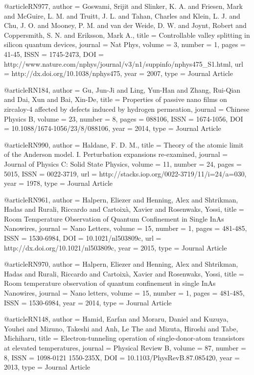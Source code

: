 @article{RN977,
   author = {Goswami, Srijit and Slinker, K. A. and Friesen, Mark and McGuire, L. M. and Truitt, J. L. and Tahan, Charles and Klein, L. J. and Chu, J. O. and Mooney, P. M. and van der Weide, D. W. and Joynt, Robert and Coppersmith, S. N. and Eriksson, Mark A.},
   title = {Controllable valley splitting in silicon quantum devices},
   journal = {Nat Phys},
   volume = {3},
   number = {1},
   pages = {41-45},
   ISSN = {1745-2473},
   DOI = {http://www.nature.com/nphys/journal/v3/n1/suppinfo/nphys475_S1.html},
   url = {http://dx.doi.org/10.1038/nphys475},
   year = {2007},
   type = {Journal Article}
}

@article{RN184,
   author = {Gu, Jun-Ji and Ling, Yun-Han and Zhang, Rui-Qian and Dai, Xun and Bai, Xin-De},
   title = {Properties of passive nano films on zircaloy-4 affected by defects induced by hydrogen permeation},
   journal = {Chinese Physics B},
   volume = {23},
   number = {8},
   pages = {088106},
   ISSN = {1674-1056},
   DOI = {10.1088/1674-1056/23/8/088106},
   year = {2014},
   type = {Journal Article}
}

@article{RN990,
   author = {Haldane, F. D. M.},
   title = {Theory of the atomic limit of the Anderson model. I. Perturbation expansions re-examined},
   journal = {Journal of Physics C: Solid State Physics},
   volume = {11},
   number = {24},
   pages = {5015},
   ISSN = {0022-3719},
   url = {http://stacks.iop.org/0022-3719/11/i=24/a=030},
   year = {1978},
   type = {Journal Article}
}

@article{RN961,
   author = {Halpern, Eliezer and Henning, Alex and Shtrikman, Hadas and Rurali, Riccardo and Cartoixà, Xavier and Rosenwaks, Yossi},
   title = {Room Temperature Observation of Quantum Confinement in Single InAs Nanowires},
   journal = {Nano Letters},
   volume = {15},
   number = {1},
   pages = {481-485},
   ISSN = {1530-6984},
   DOI = {10.1021/nl503809c},
   url = {http://dx.doi.org/10.1021/nl503809c},
   year = {2015},
   type = {Journal Article}
}

@article{RN970,
   author = {Halpern, Eliezer and Henning, Alex and Shtrikman, Hadas and Rurali, Riccardo and Cartoixà, Xavier and Rosenwaks, Yossi},
   title = {Room temperature observation of quantum confinement in single InAs Nanowires},
   journal = {Nano letters},
   volume = {15},
   number = {1},
   pages = {481-485},
   ISSN = {1530-6984},
   year = {2014},
   type = {Journal Article}
}

@article{RN148,
   author = {Hamid, Earfan and Moraru, Daniel and Kuzuya, Youhei and Mizuno, Takeshi and Anh, Le The and Mizuta, Hiroshi and Tabe, Michiharu},
   title = {Electron-tunneling operation of single-donor-atom transistors at elevated temperatures},
   journal = {Physical Review B},
   volume = {87},
   number = {8},
   ISSN = {1098-0121
1550-235X},
   DOI = {10.1103/PhysRevB.87.085420},
   year = {2013},
   type = {Journal Article}
}


